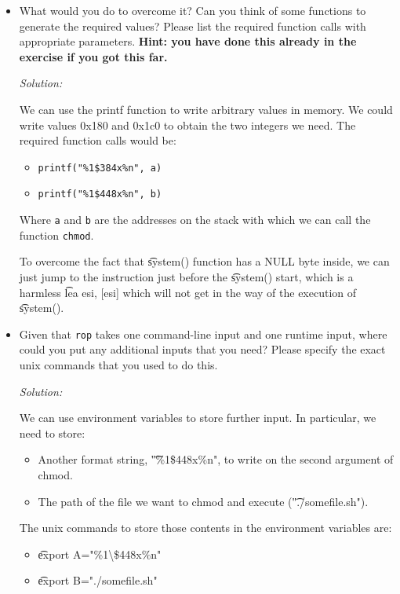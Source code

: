 \documentclass[a4paper,11pt]{article}
\newenvironment{solution}%
{\par{\noindent\small\textit{Solution:}}\vspace{-1ex}\begin{framed}}%
{\end{framed}\par}
\begin{document}
\begin{itemize}
  \item What would you do to overcome it? Can you think of some functions to
  generate the required values? Please list the required function calls with
  appropriate parameters. \textbf{Hint: you have done this already in the
  exercise if you got this far.}

  \ifsolution
  \begin{solution}
	  We can use the printf function to write arbitrary values in memory.
	  We could write values 0x180 and 0x1c0 to obtain
	  the two integers we need.
	  The required function calls would be:
	  \begin{itemize}
		  \item \texttt{printf("\%1\$384x\%n", a)}
		  \item \texttt{printf("\%1\$448x\%n", b)}
	\end{itemize}
	  Where \texttt{a} and \texttt{b} are the addresses on the stack with which we can call
	  the function \texttt{chmod}.

	  To overcome the fact that \t{system()} function has a NULL byte inside, we can just jump
	  to the instruction just before the \t{system()} start, which is a harmless \t{lea esi, [esi]} which will not get in the way of the execution of \t{system()}.
\end{solution}
  \fi

  \item Given that \texttt{rop} takes one command-line input and one runtime
  input, where could you put any additional inputs that you need? Please specify
  the exact unix commands that you used to do this.

  \ifsolution
  \begin{solution}
	  We can use environment variables to store further input. In particular, we need to store:
	  \begin{itemize}
		  \item Another format string, \t{"\%1\$448x\%n"}, to write on the second argument of chmod.
		  \item The path of the file we want to chmod and execute (\t{"./somefile.sh"}).
	  \end{itemize}
	  The unix commands to store those contents in the environment variables are:
	  \begin{itemize}
		  \item \t{export A="\%1\textbackslash\$448x\%n"}
		  \item \t{export B="./somefile.sh"}
	  \end{itemize}
\end{solution}


\end{itemize}
\end{document}
